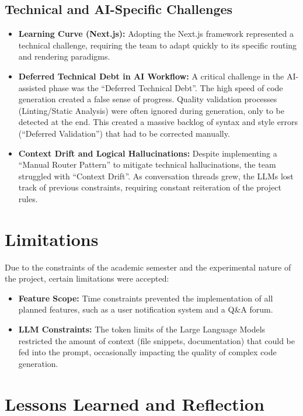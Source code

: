 \documentclass[a4paper,12pt]{report}
\begin{document}
    \subsection{Technical and AI-Specific Challenges}
    \begin{itemize}
        \item \textbf{Learning Curve (Next.js):} Adopting the Next.js framework represented a technical challenge, requiring the team to adapt quickly to its specific routing and rendering paradigms.
        
        \item \textbf{Deferred Technical Debt in AI Workflow:} A critical challenge in the AI-assisted phase was the ``Deferred Technical Debt''. The high speed of code generation created a false sense of progress. Quality validation processes (Linting/Static Analysis) were often ignored during generation, only to be detected at the end. This created a massive backlog of syntax and style errors (``Deferred Validation'') that had to be corrected manually.
        
        \item \textbf{Context Drift and Logical Hallucinations:} Despite implementing a ``Manual Router Pattern'' to mitigate technical hallucinations, the team struggled with ``Context Drift''. As conversation threads grew, the LLMs lost track of previous constraints, requiring constant reiteration of the project rules.
    \end{itemize}

    \section{Limitations}
    Due to the constraints of the academic semester and the experimental nature of the project, certain limitations were accepted:

    \begin{itemize}
        \item \textbf{Feature Scope:} Time constraints prevented the implementation of all planned features, such as a user notification system and a Q\&A forum.
        \item \textbf{LLM Constraints:} The token limits of the Large Language Models restricted the amount of context (file snippets, documentation) that could be fed into the prompt, occasionally impacting the quality of complex code generation.
    \end{itemize}

    \section{Lessons Learned and Reflection}
\end{document}
